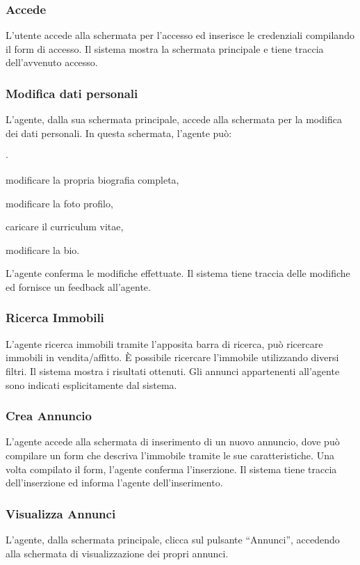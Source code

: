 \subsubsection{Accede}
L'utente accede alla schermata per l'accesso ed inserisce le credenziali 
compilando il form di accesso. Il sistema mostra la schermata principale 
e tiene traccia dell'avvenuto accesso.

\subsubsection{Modifica dati personali}
L'agente, dalla sua schermata principale, accede alla schermata per la 
modifica dei dati personali. In questa schermata, l'agente può:
\begin{list}{$\cdot$}{}
    \item modificare la propria biografia completa,
    \item modificare la foto profilo,
    \item caricare il curriculum vitae,
    \item modificare la bio.
\end{list} 
L'agente conferma le modifiche effettuate. Il sistema tiene traccia 
delle modifiche ed fornisce un feedback all'agente.

\subsubsection{Ricerca Immobili}
L'agente ricerca immobili tramite l'apposita barra di ricerca, può 
ricercare immobili in vendita/affitto. È possibile ricercare l'immobile 
utilizzando diversi filtri. Il sistema mostra i risultati ottenuti. 
Gli annunci appartenenti all'agente sono indicati esplicitamente dal sistema.

\subsubsection{Crea Annuncio}
L'agente accede alla schermata di inserimento di un nuovo annuncio, dove 
può compilare un form che descriva l'immobile tramite le sue caratteristiche.
Una volta compilato il form, l'agente conferma l'inserzione. 
Il sistema tiene traccia dell'inserzione ed informa l'agente dell'inserimento.

\subsubsection{Visualizza Annunci}
L'agente, dalla schermata principale, clicca sul pulsante “Annunci”, accedendo 
alla schermata di visualizzazione dei propri annunci.

